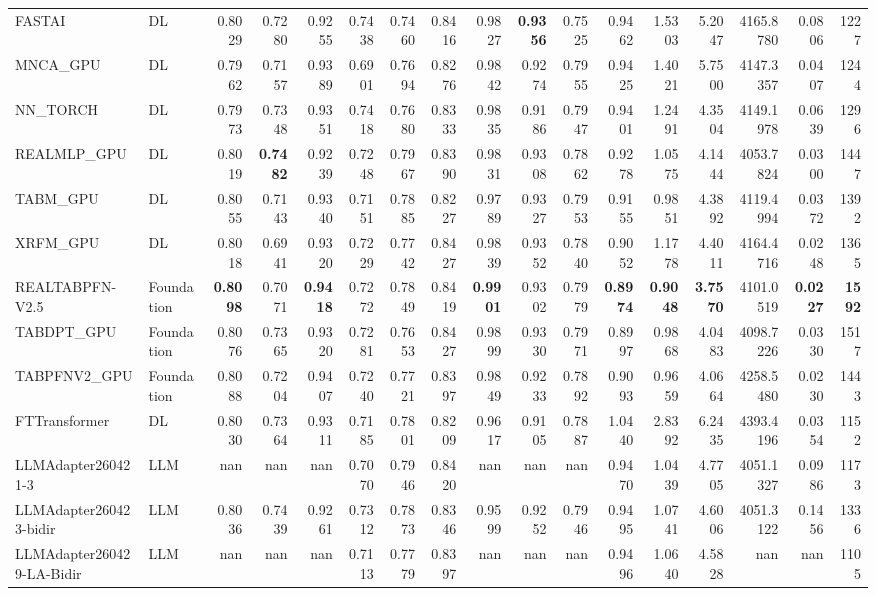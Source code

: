 \begin{table}[htbp]
{\begin{tabular}{ll|rrrrrrrrrrrrrr|r}
FASTAI & DL & 0.8029 & 0.7280 & 0.9255 & 0.7438 & 0.7460 & 0.8416 & 0.9827 & \textbf{0.9356} & 0.7525 & 0.9462 & 1.5303 & 5.2047 & 4165.8780 & 0.0806 & 1227 \\
MNCA\_GPU & DL & 0.7962 & 0.7157 & 0.9389 & 0.6901 & 0.7694 & 0.8276 & 0.9842 & 0.9274 & 0.7955 & 0.9425 & 1.4021 & 5.7500 & 4147.3357 & 0.0407 & 1244 \\
NN\_TORCH & DL & 0.7973 & 0.7348 & 0.9351 & 0.7418 & 0.7680 & 0.8333 & 0.9835 & 0.9186 & 0.7947 & 0.9401 & 1.2491 & 4.3504 & 4149.1978 & 0.0639 & 1296 \\
REALMLP\_GPU & DL & 0.8019 & \textbf{0.7482} & 0.9239 & 0.7248 & 0.7967 & 0.8390 & 0.9831 & 0.9308 & 0.7862 & 0.9278 & 1.0575 & 4.1444 & 4053.7824 & 0.0300 & 1447 \\
TABM\_GPU & DL & 0.8055 & 0.7143 & 0.9340 & 0.7151 & 0.7885 & 0.8227 & 0.9789 & 0.9327 & 0.7953 & 0.9155 & 0.9851 & 4.3892 & 4119.4994 & 0.0372 & 1392 \\
XRFM\_GPU & DL & 0.8018 & 0.6941 & 0.9320 & 0.7229 & 0.7742 & 0.8427 & 0.9839 & 0.9352 & 0.7840 & 0.9052 & 1.1778 & 4.4011 & 4164.4716 & 0.0248 & 1365 \\
REALTABPFN-V2.5 & Foundation & \textbf{0.8098} & 0.7071 & \textbf{0.9418} & 0.7272 & 0.7849 & 0.8419 & \textbf{0.9901} & 0.9302 & 0.7979 & \textbf{0.8974} & \textbf{0.9048} & \textbf{3.7570} & 4101.0519 & \textbf{0.0227} & \textbf{1592} \\
TABDPT\_GPU & Foundation & 0.8076 & 0.7365 & 0.9320 & 0.7281 & 0.7653 & 0.8427 & 0.9899 & 0.9330 & 0.7971 & 0.8997 & 0.9868 & 4.0483 & 4098.7226 & 0.0330 & 1517 \\
TABPFNV2\_GPU & Foundation & 0.8088 & 0.7204 & 0.9407 & 0.7240 & 0.7721 & 0.8397 & 0.9849 & 0.9233 & 0.7892 & 0.9093 & 0.9659 & 4.0664 & 4258.5480 & 0.0230 & 1443 \\
\midrule
FTTransformer & DL & 0.8030 & 0.7364 & 0.9311 & 0.7185 & 0.7801 & 0.8209 & 0.9617 & 0.9105 & 0.7887 & 1.0440 & 2.8392 & 6.2435 & 4393.4196 & 0.0354 & 1152 \\
LLMAdapter260421-3 & LLM & nan & nan & nan & 0.7070 & 0.7946 & 0.8420 & nan & nan & nan & 0.9470 & 1.0439 & 4.7705 & 4051.1327 & 0.0986 & 1173 \\
LLMAdapter260423-bidir & LLM & 0.8036 & 0.7439 & 0.9261 & 0.7312 & 0.7873 & 0.8346 & 0.9599 & 0.9252 & 0.7946 & 0.9495 & 1.0741 & 4.6006 & 4051.3122 & 0.1456 & 1336 \\
LLMAdapter260429-LA-Bidir & LLM & nan & nan & nan & 0.7113 & 0.7779 & 0.8397 & nan & nan & nan & 0.9496 & 1.0640 & 4.5828 & nan & nan & 1105 \\

\end{tabular}}
\end{table}
